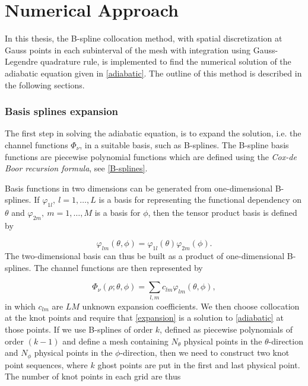 \chapter{Numerical Approach}
In this thesis, the B-spline collocation method, with spatial discretization at Gauss points in each subinterval of the mesh with integration using Gauss-Legendre quadrature rule, is implemented to find the numerical solution of the adiabatic equation given in \eqref{adiabatic}. The outline of this method is described in the following sections.

\subsection{Basis splines expansion}
The first step in solving the adiabatic equation, is to expand the solution, i.e. the channel functions $\Phi_{\nu}$, in a suitable basis, such as B-splines. The B-spline basis functions are piecewise polynomial functions which are defined using the \emph{Cox-de Boor recursion formula}, see \cref{B-splines}. 

Basis functions in two dimensions can be generated from one-dimensional B-splines. If $\varphi_{1l}, \ l= 1,\ldots,L$ is a basis for representing the functional dependency on $\theta$ and $\varphi_{2m}, \ m= 1,\ldots,M$ is a basis for $\phi$, then the tensor product basis is defined by

\begin{equation}
\varphi_{lm} (\theta,\phi) = \varphi_{1l}(\theta)\varphi_{2m}(\phi).
\end{equation}
The two-dimensional basis can thus be built as a product of one-dimensional B-splines. The channel functions are then represented by

\begin{equation}\label{expansion}
\Phi_{\nu}(\rho;\theta,\phi) = \sum_{l,m} c_{lm}\varphi_{lm} (\theta,\phi),
\end{equation}
in which $c_{lm}$ are $LM$ unknown expansion coefficients. We then choose collocation at the knot points and require that \eqref{expansion} is a solution to \eqref{adiabatic} at those points.  If we use B-splines of order $k$, defined as piecewise polynomials of order $(k-1)$ and define a mesh containing $N_{\theta}$ physical points in the $\theta$-direction and $N_{\phi}$ physical points in the $\phi$-direction, then we need to construct two knot point sequences, where $k$ ghost points are put in the first and last physical point. The number of knot points in each grid are thus

